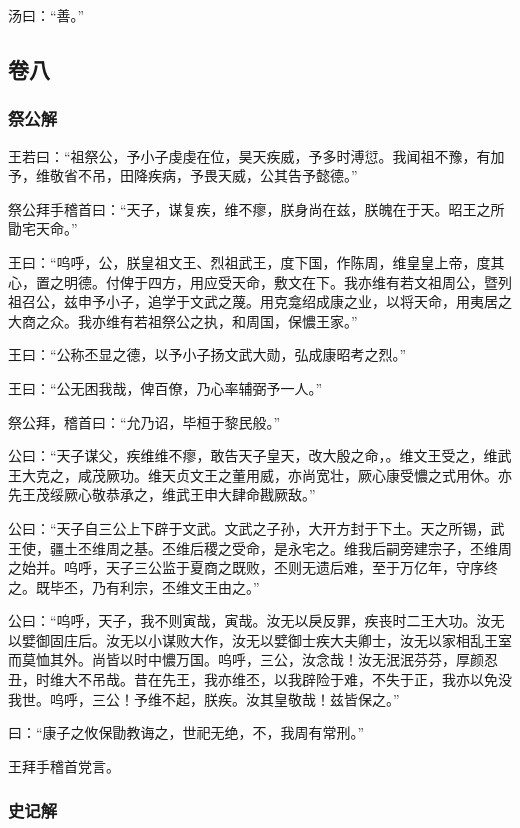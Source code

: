 \documentclass[]{article}
\begin{document}
汤曰：``善。''

\hypertarget{header-n323}{%
\subsection{卷八}\label{header-n323}}

\hypertarget{header-n327}{%
\subsubsection{祭公解}\label{header-n327}}

王若曰：``祖祭公，予小子虔虔在位，昊天疾威，予多时溥愆。我闻祖不豫，有加予，维敬省不吊，田降疾病，予畏天威，公其告予懿德。''

祭公拜手稽首曰：``天子，谋复疾，维不瘳，朕身尚在兹，朕魄在于天。昭王之所勖宅天命。''

王曰：``呜呼，公，朕皇祖文王、烈祖武王，度下国，作陈周，维皇皇上帝，度其心，置之明德。付俾于四方，用应受天命，敷文在下。我亦维有若文祖周公，暨列祖召公，兹申予小子，追学于文武之蔑。用克龛绍成康之业，以将天命，用夷居之大商之众。我亦维有若祖祭公之执，和周国，保憹王家。''

王曰：``公称丕显之德，以予小子扬文武大勋，弘成康昭考之烈。''

王曰：``公无困我哉，俾百僚，乃心率辅弼予一人。''

祭公拜，稽首曰：``允乃诏，毕桓于黎民般。''

公曰：``天子谋父，疾维维不瘳，敢告天子皇天，改大殷之命，。维文王受之，维武王大克之，咸茂厥功。维天贞文王之董用威，亦尚宽壮，厥心康受憹之式用休。亦先王茂绥厥心敬恭承之，维武王申大肆命戡厥敌。''

公曰：``天子自三公上下辟于文武。文武之子孙，大开方封于下土。天之所锡，武王使，疆土丕维周之基。丕维后稷之受命，是永宅之。维我后嗣旁建宗子，丕维周之始并。呜呼，天子三公监于夏商之既败，丕则无遗后难，至于万亿年，守序终之。既毕丕，乃有利宗，丕维文王由之。''

公曰：``呜呼，天子，我不则寅哉，寅哉。汝无以戾反罪，疾丧时二王大功。汝无以嬖御固庄后。汝无以小谋败大作，汝无以嬖御士疾大夫卿士，汝无以家相乱王室而莫恤其外。尚皆以时中憹万国。呜呼，三公，汝念哉！汝无泯泯芬芬，厚颜忍丑，时维大不吊哉。昔在先王，我亦维丕，以我辟险于难，不失于正，我亦以免没我世。呜呼，三公！予维不起，朕疾。汝其皇敬哉！兹皆保之。''

曰：``康子之攸保勖教诲之，世祀无绝，不，我周有常刑。''

王拜手稽首党言。

\hypertarget{header-n331}{%
\subsubsection{史记解}\label{header-n331}}
\end{document}
